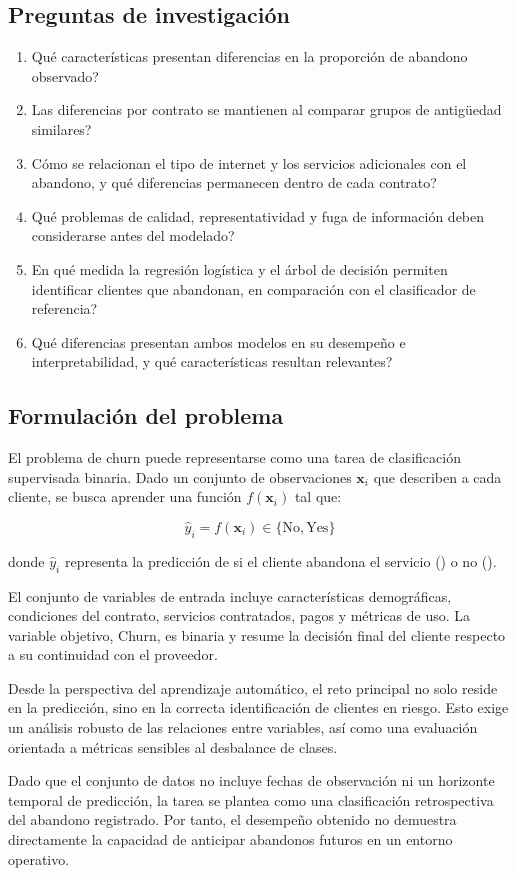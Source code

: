 \subsection{Preguntas de investigación}
\begin{enumerate}
    \item \textquestiondown Qué características presentan diferencias en la proporción de abandono observado?
    \item \textquestiondown Las diferencias por contrato se mantienen al comparar grupos de antigüedad similares?
    \item \textquestiondown Cómo se relacionan el tipo de internet y los servicios adicionales con el abandono, y qué 
    diferencias permanecen dentro de cada contrato?
    \item \textquestiondown Qué problemas de calidad, representatividad y fuga de información deben considerarse antes 
    del modelado?
    \item \textquestiondown En qué medida la regresión logística y el árbol de decisión permiten identificar clientes
    que abandonan, en comparación con el clasificador de referencia?
    \item \textquestiondown Qué diferencias presentan ambos modelos en su desempeño e interpretabilidad, y qué
    características resultan relevantes?
\end{enumerate}


\subsection{Formulación del problema}
El problema de churn puede representarse como una tarea de clasificación supervisada binaria. Dado un conjunto de observaciones $\mathbf{x}_i$ que describen a cada cliente, se busca aprender una función $f(\mathbf{x}_i)$ tal que:

\begin{equation}
\hat{y}_i = f(\mathbf{x}_i) \in \{\text{No}, \text{Yes}\}
\end{equation}

donde $\hat{y}_i$ representa la predicción de si el cliente abandona el servicio () o no (). 

El conjunto de variables de entrada incluye características demográficas, condiciones del contrato, servicios contratados, pagos y métricas de uso. La variable objetivo, Churn, es binaria y resume la decisión final del cliente respecto a su continuidad con el proveedor.

Desde la perspectiva del aprendizaje automático, el reto principal no solo reside en la predicción, sino en la correcta identificación de clientes en riesgo. Esto exige un análisis robusto de las relaciones entre variables, así como una evaluación orientada a métricas sensibles al desbalance de clases.

Dado que el conjunto de datos no incluye fechas de observación ni un horizonte temporal de predicción, la tarea se plantea
como una clasificación retrospectiva del abandono registrado. Por tanto, el desempeño obtenido no demuestra directamente
la capacidad de anticipar abandonos futuros en un entorno operativo.
